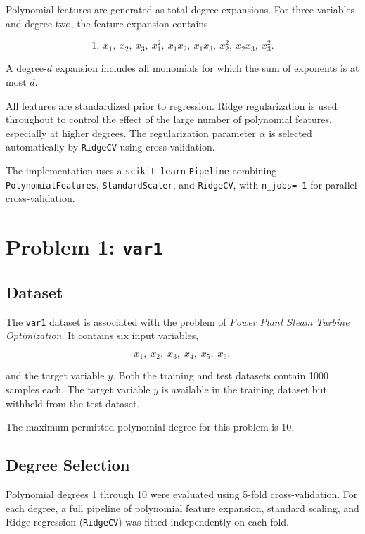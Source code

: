 \documentclass[10.5pt,a4paper]{article}
\begin{document}
Polynomial features are generated as total-degree expansions.
For three variables and degree two, the feature expansion contains

\[
1,\ x_1,\ x_2,\ x_3,\ x_1^2,\ x_1x_2,\ x_1x_3,\
x_2^2,\ x_2x_3,\ x_3^2.
\]

A degree-$d$ expansion includes all monomials for which the sum of
exponents is at most $d$.

All features are standardized prior to regression.  Ridge
regularization is used throughout to control the effect of the large
number of polynomial features, especially at higher degrees.  The
regularization parameter $\alpha$ is selected automatically by
\texttt{RidgeCV} using cross-validation.

The implementation uses a \texttt{scikit-learn} \texttt{Pipeline}
combining \texttt{PolynomialFeatures}, \texttt{StandardScaler}, and
\texttt{RidgeCV}, with \texttt{n\_jobs=-1} for parallel cross-validation.

\section{Problem 1: \texttt{var1}}

\subsection{Dataset}

The \texttt{var1} dataset is associated with the problem of
\emph{Power Plant Steam Turbine Optimization}. It contains six input
variables,

\[
x_1,\; x_2,\; x_3,\; x_4,\; x_5,\; x_6,
\]

and the target variable $y$.  Both the training and test datasets
contain 1000 samples each.  The target variable $y$ is available in
the training dataset but withheld from the test dataset.

The maximum permitted polynomial degree for this problem is 10.

\subsection{Degree Selection}

Polynomial degrees 1 through 10 were evaluated using 5-fold
cross-validation.  For each degree, a full pipeline of polynomial
feature expansion, standard scaling, and Ridge regression
(\texttt{RidgeCV}) was fitted independently on each fold.
\end{document}
